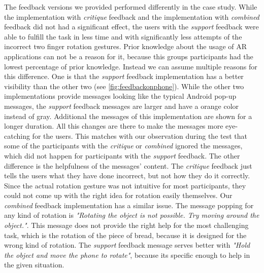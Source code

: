 \documentclass[11pt, a4paper]{article}
\begin{document}
			The feedback versions we provided performed differently in the case study. While the implementation with \emph{critique} feedback and the implementation with \emph{combined} feedback did not had a significant effect, the users with the \emph{support} feedback were able to fulfill the task in less time and with significantly less attempts of the incorrect two finger rotation gestures. Prior knowledge about the usage of \ac{AR} applications can not be a reason for it, because this groups participants had the lowest percentage of prior knowledge. Instead we can assume multiple reasons for this difference. One is that the \emph{support} feedback implementation has a better visibility than the other two (see \ref{fig:feedbackonphone}). While the other two implementations provide messages looking like the typical Android pop-up messages, the \emph{support} feedback messages are larger and have a orange color instead of gray. Additional the messages of this implementation are shown for a longer duration. All this changes are there to make the messages more eye-catching for the users. This matches with our observation during the test that some of the participants with the \emph{critique} or \emph{combined} ignored the messages, which did not happen for participants with the \emph{support} feedback. The other difference is the helpfulness of the messages' content. The \emph{critique} feedback just tells the users what they have done incorrect, but not how they do it correctly. Since the actual rotation gesture was not intuitive for most participants, they could not come up with the right idea for rotation easily themselves. Our \emph{combined} feedback implementation has a similar issue. The message popping for any kind of rotation is \emph{"Rotating the object is not possible. Try moving around the object."}. This message does not provide the right help for the most challenging task, which is the rotation of the piece of bread, because it is designed for the wrong kind of rotation. The \emph{support} feedback message serves better with \emph{"Hold the object and move the phone to rotate"}, because its specific enough to help in the given situation.			
			
\end{document}
